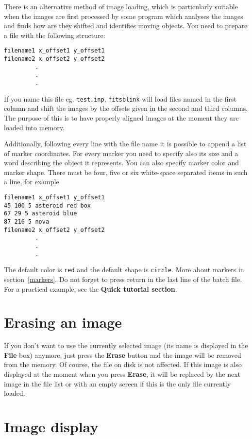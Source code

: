 \documentclass[11pt]{article}
\begin{document}
There is an alternative method of image loading, which is particularly
suitable when the images are first processed by some program which
analyses the images and finds how are they shifted and identifies
moving objects.  You need to prepare a file with the following
structure:

\begin{verbatim}
filename1 x_offset1 y_offset1
filename2 x_offset2 y_offset2
         .
         .
         .
\end{verbatim}

If you name this file eg. \verb=test.inp=, \verb=fitsblink= will load
files named in the first column and shift the images by the offsets
given in the second and third columns.  The purpose of this is to have
properly aligned images at the moment they are loaded into memory.

Additionally, following every line with the file name it is possible
to append a list of marker coordinates.  For every marker you need to
specify also its size and a word describing the object it represents.
You can also specify marker color and marker shape.  There must be
four, five or six white-space separated items in such a line, for
example

\begin{verbatim}
filename1 x_offset1 y_offset1
45 100 5 asteroid red box
67 29 5 asteroid blue 
87 216 5 nova 
filename2 x_offset2 y_offset2
         .
         .
         .
\end{verbatim}

The default color is \verb=red= and the default shape is
\verb=circle=.  More about markers in section~\ref{markers}.  Do not
forget to press return in the last line of the batch file.  For a
practical example, see the \textbf{Quick tutorial section}.

\section{Erasing an image}

If you don't want to use the currently selected image (its name is
displayed in the \textbf{File} box) anymore, just press the
\textbf{Erase} button and the image will be removed from the memory.
Of course, the file on disk is not affected.  If this image is also
displayed at the moment when you press \textbf{Erase}, it will be
replaced by the next image in the file list or with an empty screen if
this is the only file currently loaded.

\section{Image display}
\end{document}
